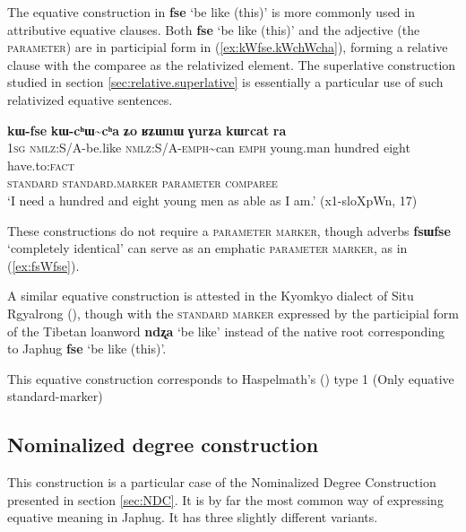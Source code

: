 \documentclass[oneside,a4paper,11pt]{article}
\newcommand{\ipa}[1]{{\phon\textbf{#1}}}
\newcommand{\forme}[2]{\ipa{#1} `#2'}
\newcommand{\rdp}{\textasciitilde{}}
\begin{document}
The equative construction in \forme{fse}{be like (this)} is more commonly used in attributive equative clauses. Both \forme{fse}{be like (this)} and the adjective (the \textsc{parameter}) are in participial form in (\ref{ex:kWfse.kWchWcha}), forming a relative clause with the comparee as the relativized element. The superlative construction studied in section \ref{sec:relative.superlative} is essentially a particular use of such relativized equative sentences.

\begin{exe}
\ex \label{ex:kWfse.kWchWcha}
\glll \ipa{aʑo} 	\ipa{kɯ-fse} 	\ipa{kɯ-cʰɯ\rdp{}cʰa} 	\ipa{ʑo} 	\ipa{ʁʑɯnɯ} 	\ipa{ɣurʑa} 	\ipa{kɯrcat} 	\ipa{ra}  \\
\textsc{1sg} \textsc{nmlz}:S/A-be.like \textsc{nmlz}:S/A-\textsc{emph}\rdp{}can \textsc{emph} young.man hundred eight have.to:\textsc{fact} \\
\textsc{standard} \textsc{standard.marker} \textsc{parameter} { } \textsc{comparee} \\
\glt `I need a hundred and eight young men as able as I am.' (x1-sloXpWn, 17)
\end{exe}

These constructions do not require a \textsc{parameter marker}, though adverbs \forme{fsɯfse}{completely identical} can serve as an emphatic \textsc{parameter marker}, as in (\ref{ex:fsWfse}).

A similar equative construction is attested in the Kyomkyo dialect of Situ Rgyalrong (\citealt[238]{prins11kyomkyo}), though with the \textsc{standard marker} expressed by the participial form of the Tibetan loanword \forme{ndʐa}{be like} instead of the native root corresponding to Japhug \forme{fse}{be like (this)}.

This equative construction corresponds to Haspelmath's (\citeyear{haspelmath17equative}) type 1 (Only equative standard-marker)

\subsection{Nominalized degree construction} \label{sec:NDC.equative}
This construction is a particular case of the Nominalized Degree Construction presented in section \ref{sec:NDC}. It is by far the most common way of expressing equative meaning in Japhug. It has three slightly different variants. 
\end{document}
